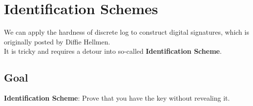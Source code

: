 \documentclass{scribe}
\begin{document}
\maketitle

\section{Identification Schemes}
We can apply the hardness of discrete log to construct digital signatures,
 which is originally posted by Diffie Hellmen.
\\
It is tricky and requires a detour into so-called \textbf{Identification Scheme}.
\\
\subsection{Goal}
\textbf{Identification Scheme}: Prove that you have the key without revealing it.
\end{document}
